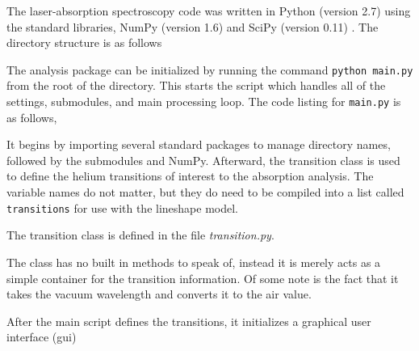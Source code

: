 The laser-absorption spectroscopy code was written in Python (version 2.7) using
the standard libraries, NumPy (version 1.6) and SciPy (version 0.11)
\cite{Jones2001}. The directory structure is as follows

{
}

The analysis package can be initialized by running the command
\texttt{python main.py} from the root of the directory. This starts the
script which handles all of the settings, submodules, and main
processing loop. The code listing for \texttt{main.py} is as follows,

\begin{singlespace}
  
\end{singlespace}

It begins by importing several standard packages to manage directory names,
followed by the submodules and NumPy. Afterward, the transition class is used to
define the helium transitions of interest to the absorption analysis. The
variable names do not matter, but they do need to be compiled into a list called
\texttt{transitions} for use with the lineshape model.

The transition class is defined in the file \emph{transition.py}.

\begin{singlespace}

\end{singlespace}

The class has no built in methods to speak of, instead it is merely acts as a
simple container for the transition information. Of some note is the fact that
it takes the vacuum wavelength and converts it to the air value.

After the main script defines the transitions, it initializes a graphical user
interface (\acs{gui}) 
